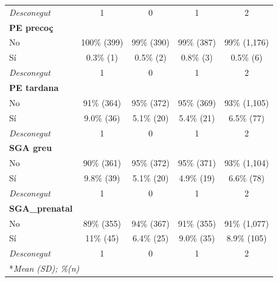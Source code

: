 \documentclass[../main.tex]{subfiles}
\begin{document}
\begin{table}[!h]
{\begin{tabular}{lcccc}
            \hspace{1em}\textit{Desconegut} & 1 & 0 & 1 & 2 \\
            \textbf{PE precoç} & & & & \\
            \hspace{1em}No & 100\% (399) & 99\% (390) & 99\% (387) & 99\% (1,176) \\
            \hspace{1em}Sí & 0.3\% (1) & 0.5\% (2) & 0.8\% (3) & 0.5\% (6) \\
            \hspace{1em}\textit{Desconegut} & 1 & 0 & 1 & 2 \\
            \textbf{PE tardana} & & & & \\
            \hspace{1em}No & 91\% (364) & 95\% (372) & 95\% (369) & 93\% (1,105) \\
            \hspace{1em}Sí & 9.0\% (36) & 5.1\% (20) & 5.4\% (21) & 6.5\% (77) \\
            \hspace{1em}\textit{Desconegut} & 1 & 0 & 1 & 2 \\
            \textbf{SGA greu} & & & & \\
            \hspace{1em}No & 90\% (361) & 95\% (372) & 95\% (371) & 93\% (1,104) \\
            \hspace{1em}Sí & 9.8\% (39) & 5.1\% (20) & 4.9\% (19) & 6.6\% (78) \\
            \hspace{1em}\textit{Desconegut} & 1 & 0 & 1 & 2 \\
            \textbf{SGA\_prenatal} & & & & \\
            \hspace{1em}No & 89\% (355) & 94\% (367) & 91\% (355) & 91\% (1,077) \\
            \hspace{1em}Sí & 11\% (45) & 6.4\% (25) & 9.0\% (35) & 8.9\% (105) \\
            \hspace{1em}\textit{Desconegut} & 1 & 0 & 1 & 2 \\
            \bottomrule
            \multicolumn{5}{l}{\rule{0pt}{1em}*\textit{Mean (SD); \%(n)}} \\
        \end{tabular}%
        }
    \end{table}
\end{document}
